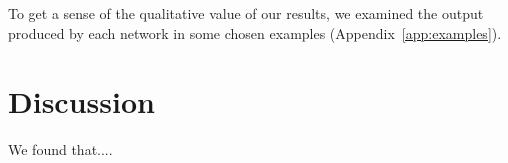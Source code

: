 To get a sense of the qualitative value of our results, we examined the output produced by each network in some chosen examples (Appendix~\ref{app:examples}).


\section{Discussion}
We found that....

